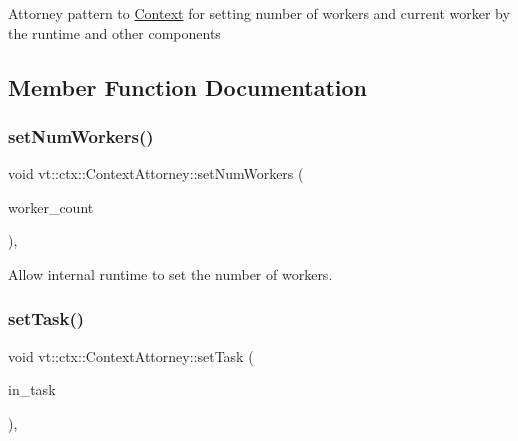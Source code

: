 Attorney pattern to \hyperlink{structvt_1_1ctx_1_1_context}{Context} for setting number of workers and current worker by the runtime and other components 

\subsection{Member Function Documentation}
\mbox{\label{structvt_1_1ctx_1_1_context_attorney_ab853e0d8039812dfb6b1158f30b39a2a}} 
\subsubsection{\texorpdfstring{set\+Num\+Workers()}{setNumWorkers()}}
{\footnotesize\ttfamily void vt\+::ctx\+::\+Context\+Attorney\+::set\+Num\+Workers (\begin{DoxyParamCaption}\item[{\hyperlink{namespacevt_aa93398ea48f2cb6c188512250f7cc248}{Worker\+Count\+Type} const}]{worker\+\_\+count }\end{DoxyParamCaption})\hspace{0.3cm}{\ttfamily [static]}, {\ttfamily [private]}}



Allow internal runtime to set the number of workers. 

\mbox{\label{structvt_1_1ctx_1_1_context_attorney_aa9e72be8e7f7ccc50cc235b1177d8add}} 
\subsubsection{\texorpdfstring{set\+Task()}{setTask()}}
{\footnotesize\ttfamily void vt\+::ctx\+::\+Context\+Attorney\+::set\+Task (\begin{DoxyParamCaption}\item[{\hyperlink{structvt_1_1runnable_1_1_runnable_new}{runnable\+::\+Runnable\+New} $\ast$}]{in\+\_\+task }\end{DoxyParamCaption})\hspace{0.3cm}{\ttfamily [static]}, {\ttfamily [private]}}



